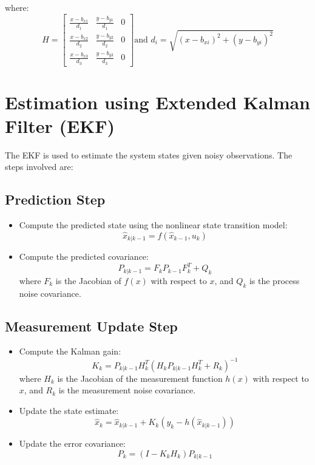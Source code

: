 \documentclass[a4paper,11pt]{article}
\begin{document}
where:
\[
H =
\begin{bmatrix}
\frac{x - b_{x1}}{d_1} & \frac{y - b_{y1}}{d_1} & 0 \\
\frac{x - b_{x2}}{d_2} & \frac{y - b_{y2}}{d_2} & 0 \\
\frac{x - b_{x3}}{d_3} & \frac{y - b_{y3}}{d_3} & 0
\end{bmatrix}
\text{and } d_i = \sqrt{(x - b_{xi})^2 + (y - b_{yi})^2}
\]

\section*{Estimation using Extended Kalman Filter (EKF)}

The EKF is used to estimate the system states given noisy observations. The steps involved are:

\subsection*{Prediction Step}
\begin{itemize}
    \item Compute the predicted state using the nonlinear state transition model:
    \begin{equation}
        \hat{x}_{k|k-1} = f(\hat{x}_{k-1}, u_k)
    \end{equation}
    \item Compute the predicted covariance:
    \begin{equation}
        P_{k|k-1} = F_k P_{k-1} F_k^T + Q_k
    \end{equation}
    where $F_k$ is the Jacobian of $f(x)$ with respect to $x$, and $Q_k$ is the process noise covariance.
\end{itemize}

\subsection*{Measurement Update Step}
\begin{itemize}
    \item Compute the Kalman gain:
    \begin{equation}
        K_k = P_{k|k-1} H_k^T (H_k P_{k|k-1} H_k^T + R_k)^{-1}
    \end{equation}
    where $H_k$ is the Jacobian of the measurement function $h(x)$ with respect to $x$, and $R_k$ is the measurement noise covariance.
    \item Update the state estimate:
    \begin{equation}
        \hat{x}_k = \hat{x}_{k|k-1} + K_k (y_k - h(\hat{x}_{k|k-1}))
    \end{equation}
    \item Update the error covariance:
    \begin{equation}
        P_k = (I - K_k H_k) P_{k|k-1}
    \end{equation}
\end{itemize}
\end{document}
